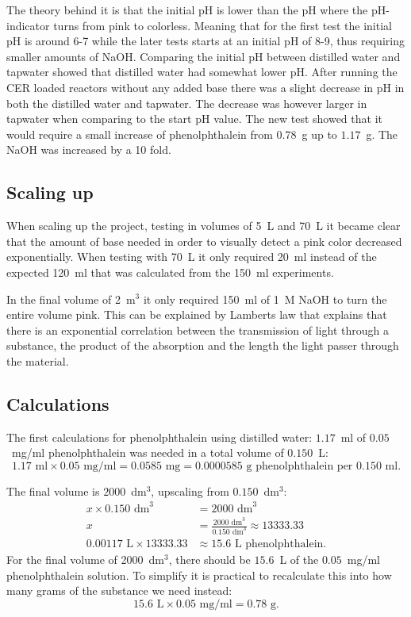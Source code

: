 The theory behind it is that the initial pH is lower than the pH where the pH-indicator turns from pink to colorless. Meaning that for the first test the initial pH is around 6-7 while the later tests starts at an initial pH of 8-9, thus requiring smaller amounts of NaOH.
Comparing the initial pH between distilled water and tapwater showed that distilled water had somewhat lower pH. After running the CER loaded reactors without any added base there was a slight decrease in pH in both the distilled water and tapwater. The decrease was however larger in tapwater when comparing to the start pH value.
The new test showed that it would require a small increase of phenolphthalein from $0.78$~g up to $1.17$~g. The NaOH was increased by a 10 fold.

\subsection{Scaling up}
When scaling up the project, testing in volumes of 5~L and 70~L it became clear that the amount of base needed in order to visually detect a pink color decreased exponentially. When testing with 70~L it only required 20~ml instead of the expected 120~ml that was calculated from the 150~ml experiments.

In the final volume of 2~m$^3$ it only required 150~ml of 1~M NaOH to turn the entire volume pink.
This can be explained by Lamberts law that explains that there is an exponential correlation between the transmission of light through a substance, the product of the absorption and the length the light passer through the material.\cite{pierre}

\subsection{Calculations}\label{sec:calculations}
The first calculations for phenolphthalein using distilled water:
$1.17$~ml of $0.05$~mg/ml phenolphthalein was needed in a total volume of $0.150$~L:
\begin{equation}\label{eq:concentration}
    1.17 \text{ ml} \times 0.05 \text{ mg/ml}
    = 0.0585 \text{ mg} = 0.0000585 \text{ g} \text{ phenolphthalein per } 0.150 \text{ ml}.
\end{equation}

The final volume is $2000$~dm$^3$, upscaling from $0.150$~dm$^3$:
\begin{align}
x \times 0.150 \text{ dm}^3 &= 2000 \text{ dm}^3 \nonumber \\
x &= \frac{2000 \text{ dm}^3}{0.150 \text{ dm}^3} \approx 13333.33 \\
0.00117 \text{ L} \times 13333.33 &\approx 15.6 \text{ L phenolphthalein.} 
\end{align}
For the final volume of 2000~dm$^3$, there should be $15.6$~L of the $0.05$~mg/ml phenolphthalein solution.
To simplify it is practical to recalculate this into how many grams of the substance we need instead:
\begin{equation}
    15.6 \text{ L} \times 0.05 \text{ mg/ml} = 0.78 \text{ g}.
\end{equation}

